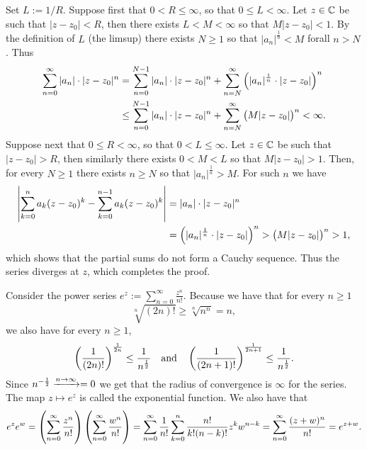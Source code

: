 \documentclass[11pt,a4paper]{article}
\begin{document}
\begin{proofof}{}
  Set $L := 1/R$.
  Suppose first that $0 < R \le \infty$, so that $0 \le L < \infty$.
  Let $z \in \mathbb{C}$ be such that $|z - z_0| < R$, then there exists
  $L < M < \infty$ so that $M |z - z_0| < 1$.
  By the definition of $L$ (the limsup) there exists $N \geq 1$ so that
  $|a_n|^{\frac 1n} < M$ forall $n > N$. Thus
  \begin{align*}
    \sum_{n=0}^{\infty} |a_n| \cdot |z - z_0|^n &=
    \sum_{n=0}^{N-1} |a_n| \cdot |z - z_0|^n +
    \sum_{n=N}^{\infty} \del{|a_n|^{\frac 1n} \cdot |z - z_0|}^n \\ &\le
    \sum_{n=0}^{N-1} |a_n| \cdot |z - z_0|^n +
    \sum_{n=N}^{\infty} \del{M |z - z_0|}^n <
    \infty.
  \end{align*}
  Suppose next that $0 \le R < \infty$, so that $0 < L \le \infty$.
  Let $z \in \mathbb{C}$ be such that $|z - z_0| > R$, then similarly there
  exists $0 < M < L$ so that $M |z - z_0| > 1$.
  Then, for every $N \geq 1$ there exists $n \geq N$ so that 
  $|a_n|^{\frac 1n} > M$.
  For such $n$ we have
  \begin{align*}
    \abs{\sum_{k=0}^{n} a_k(z-z_0)^k - \sum_{k=0}^{n-1} a_k(z-z_0)^k} &=
    |a_n| \cdot |z - z_0|^n \\ &=
    \del{|a_n|^{\frac 1n} \cdot |z - z_0|}^n >
    \del{M |z - z_0|}^n > 1,
  \end{align*}
  which shows that the partial sums do not form a Cauchy sequence.
  Thus the series diverges at $z$, which completes the proof.
\end{proofof}

\begin{example}
  Consider the power series $e^z := \sum_{n=0}^{\infty} \frac{z^n}{n!}$.
  Because we have that for every $n \geq 1$
  \[
    \sqrt[n]{(2n)!} \geq \sqrt[n]{n^n} = n,
  \]
  we also have for every $n \geq 1$,
  \[
    \del{\frac{1}{(2n)!}}^{\frac{1}{2n}} \le \frac{1}{n^{\half}}
    \tand
    \del{\frac{1}{(2n+1)!}}^{\frac{1}{2n+1}} \le \frac{1}{n^{\half}}.
  \]
  Since $n^{-\frac{1}{2}} \xrightarrow{n \to \infty} = 0$ we get that the radius of
  convergence is $\infty$ for the series.
  The map $z \mapsto e^z$ is called the exponential function.
  We also have that
  \begin{align*}
    e^z e^w =
    \del{\sum_{n=0}^{\infty} \frac{z^n}{n!}}
    \del{\sum_{n=0}^{\infty} \frac{w^n}{n!}} =
    \sum_{n=0}^{\infty}
    \frac{1}{n!} \sum_{k=0}^{n} \frac{n!}{k!(n-k)!} z^k w^{n-k} =
    \sum_{n=0}^{\infty} \frac{(z+w)^n}{n!} =
    e^{z + w}.
  \end{align*}
\end{example}
\end{document}
